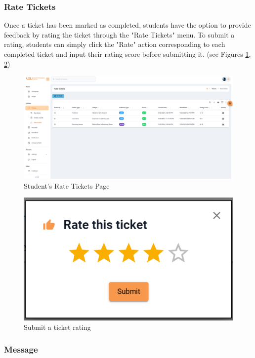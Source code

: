 	
	\subsubsection{Rate Tickets}
	Once a ticket has been marked as completed, students have the option to provide feedback by rating the ticket through the "Rate Tickets" menu. To submit a rating, students can simply click the "Rate" action corresponding to each completed ticket and input their rating score before submitting it. (see Figures \ref{fig:gui-std-rate-ticket}, \ref{fig:gui-rate-ticket-modal})
	
	\begin{figure}[H]
		\centering
		\includegraphics[width=1.0\linewidth]{graphics/gui/student/rate-ticket}
		\caption{Student's Rate Tickets Page}
		\label{fig:gui-std-rate-ticket}
	\end{figure}
	
	
	
	\begin{figure}[H]
		\centering
		\includegraphics[width=0.5\linewidth]{graphics/gui/student/rate-ticket1}
		\caption{Submit a ticket rating}
		\label{fig:gui-rate-ticket-modal}
	\end{figure}
	
	
	
	\subsubsection{Message}

